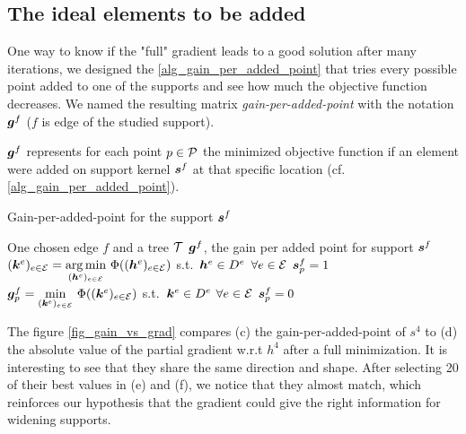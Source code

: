 \subsection{The ideal elements to be added}\label{sec_gain_per_added_point}

One way to know if the "full" gradient leads to a good solution after many iterations, we designed the \cref{alg_gain_per_added_point} that tries every possible point added to one of the supports and see how much the objective function decreases. We named the resulting matrix \emph{gain-per-added-point} with the notation $\g^f$ ($f$ is edge of the studied support).

$\g^f$ represents for each point $p \in \P$ the minimized objective function if an element were added on support kernel $\s^f$ at that specific location (cf. \cref{alg_gain_per_added_point}).

\begin{algorithm}[!ht]
    \caption{Gain-per-added-point for the support $\s^f$} \label{alg_gain_per_added_point}
  \begin{algorithmic}[0]
    \Input One chosen edge $f$ and a tree $\T$
    \Output $\g^f$, the gain per added point for support $\s^f$
    \State $(\k^e)_{e \in \E} = \underset{(\h^e)_{e \in \E}}{\arg\min}~ \Phi ((\h^e)_{e \in \E})$ \quad s.t.~$\h^e \in D^e$ \quad $\forall e \in \E$ 
    	\State $\s^f_p = 1$ 
    	\State $\g^f_p = \underset{(\k^e)_{e \in \E}}{\min}~ \Phi ((\k^e)_{e \in \E})$ \quad s.t.~$\k^e \in D^e$ \quad $\forall e \in \E$
    	\State $\s^f_p = 0$ 
    \EndFor
  \end{algorithmic}
\end{algorithm}

The figure \ref{fig_gain_vs_grad} compares (c) the gain-per-added-point of $s^4$ to (d) the absolute value of the partial gradient w.r.t $h^4$ after a full minimization. It is interesting to see that they share the same direction and shape. After selecting 20 of their best values in (e) and (f), we notice that they almost match, which reinforces our hypothesis that the gradient could give the right information for widening supports.

